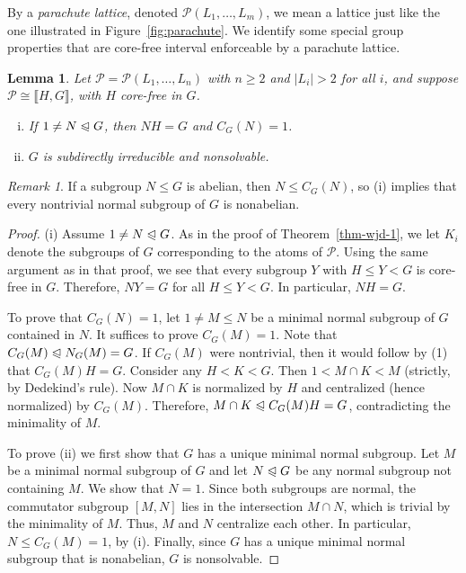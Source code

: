 \documentclass{gen-j-l}
\newcommand{\lb}{\ensuremath{\llbracket}}
\newcommand{\rb}{\ensuremath{\rrbracket}}
\newcommand{\<}{\ensuremath{\langle}}
\renewcommand{\>}{\ensuremath{\rangle}}
\theoremstyle{plain}
\newtheorem{lemma}[theorem]{Lemma}
\theoremstyle{definition}
\theoremstyle{remark}
\newtheorem*{remark}{Remark}
\numberwithin{theorem}{section}
\numberwithin{claim}{section}
\numberwithin{equation}{section}
\numberwithin{conjecture}{section}
\renewcommand{\leq}{\ensuremath{\leqslant}}
\renewcommand{\geq}{\ensuremath{\geqslant}}
\newcommand{\subnormal}{\ensuremath{\trianglelefteqslant}}
\newcommand{\2}{\ensuremath{\mathbf{2}}}
\newcommand{\3}{\ensuremath{\mathbf{3}}}
\newcommand{\sP}{\ensuremath{\mathscr{P}}}
\begin{document}
By a \emph{parachute lattice}, denoted $\sP(L_1, \dots, L_m)$,
we mean a lattice just like the one illustrated in 
Figure~\ref{fig:parachute}.
We identify some special group properties that are core-free interval
enforceable by a parachute lattice.
\begin{lemma}
\label{lemma-wjd-5}
 Let $\sP = \sP(L_1, \dots, L_n)$ with $n\geq 2$ and $|L_i|>2$ for all
$i$, and suppose $\sP \cong \lb H, G \rb$, with $H$ core-free in $G$.  
\begin{enumerate}[(i)]
\item If $1\neq N \subnormal G$, then $NH = G$ and $C_G(N)=1$.
\item $G$ is subdirectly irreducible and nonsolvable.
\end{enumerate}
\end{lemma}
\begin{remark}
If a subgroup $N\leq G$ is abelian, then $N \leq C_G(N)$, so (i) implies
that every nontrivial normal subgroup of $G$ is nonabelian.  
\end{remark}
\begin{proof}
(i)
Assume $1\neq N \subnormal G$. 
As in the proof of Theorem~\ref{thm-wjd-1}, we let $K_i$
denote the subgroups of $G$ corresponding to the atoms of $\sP$.
Using the same argument as in that proof, we see that every subgroup $Y$ with 
$H \leq Y < G$ is core-free in $G$.  Therefore, 
$NY=G$ for all $H \leq Y < G$. In particular, $NH=G$. 

To prove that $C_G(N)=1$, let $1\neq M \leq N$ be a minimal normal subgroup of
$G$ contained in $N$.  It suffices to prove $C_G(M)= 1$.
Note that $C_G(M) \subnormal N_G(M) =G$.  If $C_G(M)$ were nontrivial, then it
would follow by (1) that $C_G(M)H = G$.
Consider any $H< K < G$. Then $1 < M\cap K < M$ (strictly, by
Dedekind's rule). Now $M\cap K$ is normalized by $H$ and centralized
(hence normalized) by $C_G(M)$.  
Therefore, $M\cap K \subnormal C_G(M)H = G$, contradicting the minimality of
$M$.  

To prove (ii) we first show that $G$ has a unique minimal normal subgroup.  Let
$M$ be a minimal
normal subgroup of $G$ and let $N \subnormal G$ be any normal subgroup not 
containing $M$.  We show that $N = 1$.  Since both subgroups
are normal, the commutator subgroup
$[M,N]$
lies in the intersection $M\cap N$, which is trivial by the minimality of $M$.   
Thus, $M$ and $N$ centralize each other.  In particular,
$N \leq C_G(M) = 1$, by (i).
Finally, since $G$ has a unique minimal normal subgroup that is nonabelian, $G$
is nonsolvable.
\end{proof}
\end{document}
